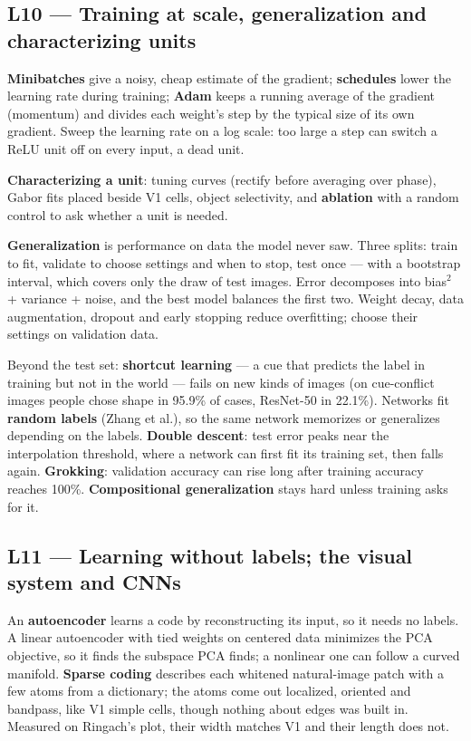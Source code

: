 \documentclass[11pt]{article}
\begin{document}
\subsection{L10 --- Training at scale, generalization and characterizing units}

\textbf{Minibatches} give a noisy, cheap estimate of the gradient;
\textbf{schedules} lower the learning rate during training; \textbf{Adam} keeps
a running average of the gradient (momentum) and divides each weight's step by
the typical size of its own gradient. Sweep the learning rate on a log scale:
too large a step can switch a ReLU unit off on every input, a dead unit.

\textbf{Characterizing a unit}: tuning curves (rectify before averaging over
phase), Gabor fits placed beside V1 cells, object selectivity, and
\textbf{ablation} with a random control to ask whether a unit is needed.

\textbf{Generalization} is performance on data the model never saw. Three
splits: train to fit, validate to choose settings and when to stop, test once
--- with a bootstrap interval, which covers only the draw of test images. Error
decomposes into bias$^2$ + variance + noise, and the best model balances the
first two. Weight decay, data augmentation, dropout and early stopping reduce
overfitting; choose their settings on validation data.

Beyond the test set: \textbf{shortcut learning} --- a cue that predicts the label
in training but not in the world --- fails on new kinds of images (on
cue-conflict images people chose shape in 95.9\% of cases, ResNet-50 in 22.1\%).
Networks fit \textbf{random labels} (Zhang et al.), so the same network memorizes
or generalizes depending on the labels. \textbf{Double descent}: test error peaks
near the interpolation threshold, where a network can first fit its training
set, then falls again. \textbf{Grokking}: validation accuracy can rise long after
training accuracy reaches 100\%. \textbf{Compositional generalization} stays hard
unless training asks for it.

\subsection{L11 --- Learning without labels; the visual system and CNNs}

An \textbf{autoencoder} learns a code by reconstructing its input, so it needs no
labels. A linear autoencoder with tied weights on centered data minimizes the PCA
objective, so it finds the subspace PCA finds; a nonlinear one can follow a
curved manifold. \textbf{Sparse coding} describes each whitened natural-image
patch with a few atoms from a dictionary; the atoms come out localized, oriented
and bandpass, like V1 simple cells, though nothing about edges was built in.
Measured on Ringach's plot, their width matches V1 and their length does not.
\end{document}
